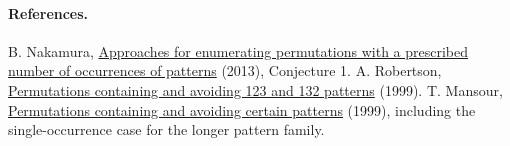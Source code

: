 \documentclass[11pt,letterpaper]{article}
\begin{document}
\paragraph{References.}
B. Nakamura, \href{https://arxiv.org/pdf/1301.5080}{Approaches for enumerating permutations with a prescribed number of occurrences of patterns} (2013), Conjecture 1.
A. Robertson, \href{https://doi.org/10.46298/dmtcs.261}{Permutations containing and avoiding 123 and 132 patterns} (1999).
T. Mansour, \href{https://arxiv.org/abs/math/9911243}{Permutations containing and avoiding certain patterns} (1999), including the single-occurrence case for the longer pattern family.
\end{document}
